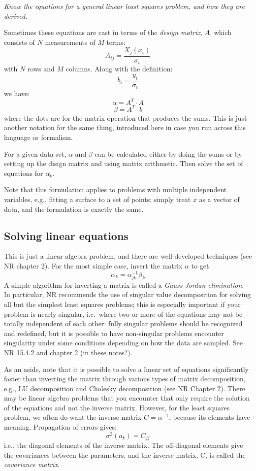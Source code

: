 \documentclass[12pt]{article}
\begin{document}
\colorbox{hl}{\parbox{0.9\textwidth}
{\emph{Know the equations for a general linear least squares
problem, and how they are derived.}}}

Sometimes these equations are cast in terms of the \emph{design matrix},
$A$, which consists of $N$ measurements of $M$ terms:
$$ A_{ij} = \frac{X_j(x_i)}{\sigma_i}  $$
with $N$ rows and $M$ columns. Along with the definition:
$$ b_i = \frac{y_i}{\sigma_i} $$
we have:
$$ \alpha = A^T \cdot A $$
$$ \beta = A^T \cdot b $$
where the dots are for the matrix operation that produces the sums.
This is just another notation for the same thing, introduced here in
case you run across this language or formalism.

For a given data set, $\alpha$ and $\beta$ can be calculated either
by doing the sums or by setting up the disign matrix and using matrix
arithmetic. Then solve the set of equations for $\alpha_k$.

Note that this formulation applies to problems with multiple
independent variables, e.g., fitting a surface to a set of points;
simply treat $x$ as a vector of data, and the formulation is exactly
the same.

\subsection{Solving linear equations}

This is just a linear algebra problem, and there are well-developed
techniques (see NR chapter 2). For the most simple case, invert the matrix $\alpha$
to get
$$ \alpha_k = \alpha_{jk}^{-1}\beta_k $$
A simple algorithm for inverting a matrix is called a
\emph{Gauss-Jordan elimination}. In particular, NR recommends
the use of singular value decomposition for solving all but the
simplest least squares problems; this is especially important if
your problem is nearly singular, i.e.\ where two or more of the
equations may not be totally independent of each other:
fully singular problems should be recognized and redefined,
but it is possible to have non-singular problems encounter
singularity under some conditions depending on how the data are
sampled. See NR 15.4.2 and chapter 2 (in these notes?).

As an aside, note that it is possible to solve a linear set of equations
significantly faster than inverting the matrix through various types of
matrix decomposition, e.g., LU decomposition and Cholesky decomposition
(see NR Chapter 2). There may be linear algebra problems that you
encounter that only require the solution of the equations and not the
inverse matrix. However, for the least squares problem, we often
do want the inverse matrix $C = \alpha^{-1}$, because its elements
have meaning. Propagation of errors gives:
$$ \sigma^{2}(a_{k}) = C_{jj}  $$
i.e., the diagonal elements of the inverse matrix. The off-diagonal
elements give the covariances between the parameters, and the inverse
matrix, C, is called the \emph{covariance matrix}.
\end{document}

